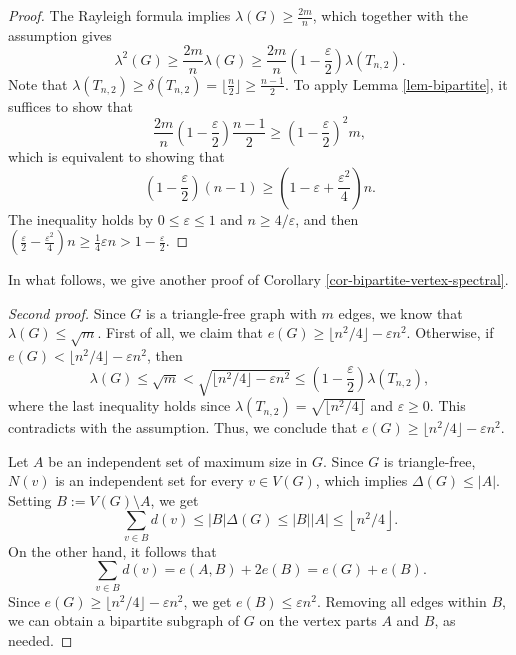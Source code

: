 \documentclass[11pt,a4paper]{article}
\theoremstyle{definition}
\theoremstyle{remark}
\begin{document}
\begin{proof}
    The Rayleigh formula implies $\lambda (G)\ge \frac{2m}{n}$, which together with the assumption gives  
    \[ \lambda^2(G)\ge \frac{2m}{n} \lambda (G) \ge 
    \frac{2m}{n} \left(1- \frac{\varepsilon}{2}\right) 
    \lambda (T_{n,2}).\]  
    Note that $\lambda (T_{n,2}) \ge \delta (T_{n,2}) =\lfloor \frac{n}{2}\rfloor \ge \frac{n-1}{2}$. 
    To apply Lemma \ref{lem-bipartite}, it suffices to show that 
    \[ \frac{2m}{n}\left(1- \frac{\varepsilon}{2}\right) \frac{n-1}{2} \ge 
    \left(1-\frac{\varepsilon}{2}\right)^2 m, \] 
which is equivalent to showing that 
\[ \left(1- \frac{\varepsilon}{2}\right) {(n-1)} 
\ge 
\left(1- \varepsilon+ \frac{\varepsilon^2}{4} \right)n. \] 
    The inequality holds by $0\le \varepsilon \le 1$ and 
    $n\ge 4/\varepsilon$, and then  
    $(\frac{\varepsilon}{2} -\frac{\varepsilon^2}{4}) n \ge \frac{1}{4}\varepsilon n > 1- \frac{\varepsilon}{2}$. 
\end{proof}

In what follows, we give another proof of Corollary \ref{cor-bipartite-vertex-spectral}. 

\begin{proof}[Second proof]
Since $G$ is a triangle-free graph with $m$ edges, we know that $\lambda (G)\le \sqrt{m}$. 
    First of all, we claim that $e(G)\ge \lfloor n^2/4 \rfloor  -\varepsilon n^2$. 
    Otherwise, if $e(G)< \lfloor n^2/4 \rfloor  -\varepsilon n^2$, then 
    \[ \lambda (G)\le \sqrt{m} 
    < \sqrt{\big\lfloor {n^2}/{4} \big\rfloor  -\varepsilon n^2} \le \left(1- \frac{\varepsilon}{2}\right)\lambda (T_{n,2}), \]  
    where the last inequality holds since $\lambda (T_{n,2}) = \sqrt{\lfloor n^2/4\rfloor}$ and  $\varepsilon \ge 0$. This contradicts with the assumption. Thus, we conclude that $e(G)\ge \lfloor n^2/4\rfloor - \varepsilon n^2$. 

    Let $A$ be an independent set of maximum size in $G$. 
Since $G$ is triangle-free, $N(v)$ is an independent set for every $v\in V(G)$, which implies $\Delta(G) \le |A|$. 
Setting $B:=V(G)\setminus A$, we get 
\[ \sum_{v\in B} d(v) \le |B| \Delta (G) \le |B| |A| 
\le \left\lfloor  {n^2}/{4} \right\rfloor.  \]  
On the other hand, it follows that 
\[  \sum_{v\in B} d(v) =e(A,B) + 2e(B) = e(G) + e(B).  \]
Since $e(G)\ge \lfloor {n^2}/{4}\rfloor - \varepsilon n^2$, we get $e(B)\le \varepsilon n^2$. 
Removing all edges within $B$, we can obtain a  bipartite subgraph of $G$ on the vertex parts $A$ and $B$, as needed.   
\end{proof}
\end{document}
